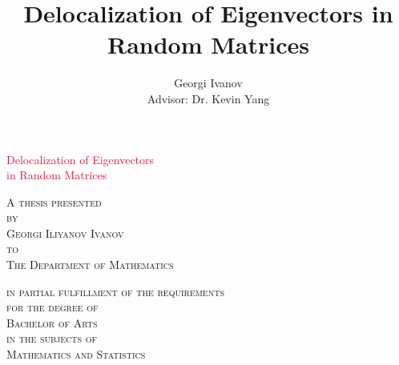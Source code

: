 \documentclass[11pt]{article}
\title{Delocalization of Eigenvectors in Random Matrices}
\author{Georgi Ivanov\\Advisor: Dr. Kevin Yang}
\date{}
\begin{document}
\renewcommand{\contentsname}{Contents}
\renewcommand{\refname}{References}

\begin{titlepage}
    \begin{center}
        \vspace*{4cm}
        
        \Huge{\textcolor{crimson}{Delocalization of Eigenvectors \\ \vspace{-0.5cm} in Random Matrices}}
        
        \vspace{2cm}
        
        \Large{A \textsc{thesis presented\\
        \vspace{-0.5cm}
		by\\
		\vspace{-0.5cm}
        Georgi Iliyanov Ivanov\\
        \vspace{-0.5cm}
			to\\ \vspace{-0.5cm}
        The Department of Mathematics}}
        
        \vspace{1cm}
        
        \Large{\textsc{in partial fulfillment of the requirements\\ \vspace{-0.5cm}
        for the degree of\\ \vspace{-0.5cm}
        Bachelor of Arts\\ \vspace{-0.5cm}
        in the subjects of\\ \vspace{-0.5cm}
        Mathematics and Statistics}}
        

\end{center}
\end{titlepage}
\end{document}
